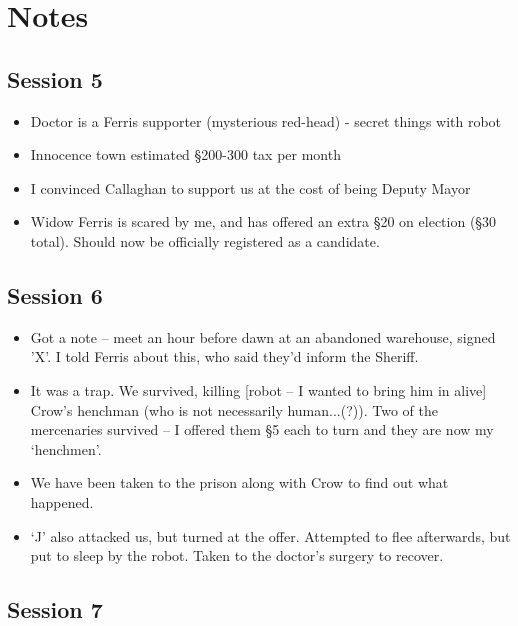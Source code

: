 \documentclass[10pt,a4paper]{article}
\begin{document}
\onecolumn

\section*{Notes}

\subsection*{Session 5}

  \begin{itemize}
    \item Doctor is a Ferris supporter (mysterious red-head) - secret things with robot
    \item Innocence town estimated §200-300 tax per month
    \item I convinced Callaghan to support us at the cost of being Deputy Mayor
    \item Widow Ferris is scared by me, and has offered an extra §20 on election (§30 total). Should now be officially registered as a candidate.
  \end{itemize}
  
\subsection*{Session 6}

  \begin{itemize}
    \item Got a note -- meet an hour before dawn at an abandoned warehouse, signed 'X'. I told Ferris about this, who said they'd inform the Sheriff.
    \item It was a trap. We survived, killing [robot -- I wanted to bring him in alive] Crow's henchman (who is not necessarily human...(?)). Two of the mercenaries survived -- I offered them §5 each to turn and they are now my `henchmen'.
    \item We have been taken to the prison along with Crow to find out what happened.
    \item `J' also attacked us, but turned at the offer. Attempted to flee afterwards, but put to sleep by the robot. Taken to the doctor's surgery to recover.
  \end{itemize}
  
\subsection*{Session 7}
  
\end{document}
